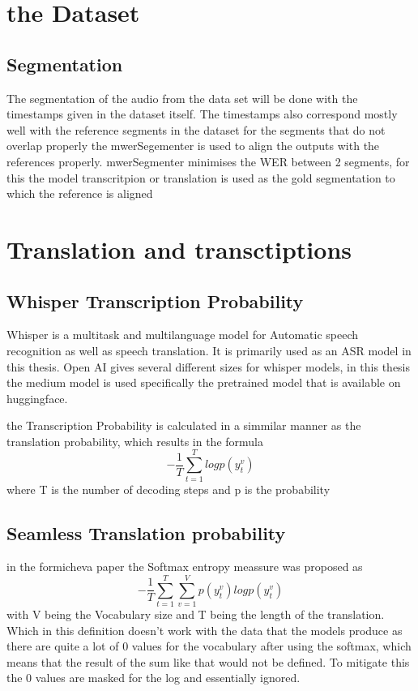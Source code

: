 


\chapter{the Dataset}
\label{ch:FirstContent}

\section{Segmentation}
\label{sec:FirstContent:FirstSection}
The segmentation of the audio from the data set will be done with the timestamps given in the dataset itself. The timestamps also correspond mostly well with the reference segments in the dataset 
for the segments that do not overlap properly the mwerSegementer is used to align the outputs with the references properly. 
mwerSegmenter minimises the WER between 2 segments,  for this the model transcritpion or translation is used as the gold segmentation to which the reference is aligned 

\chapter{Translation and transctiptions}
\section{Whisper Transcription Probability}
Whisper \cite{radford2022robust} is a multitask and multilanguage model for Automatic speech recognition as well as speech translation. It is primarily used as an ASR model in this thesis. Open AI gives several different sizes for whisper models, in this thesis the medium model is used specifically the pretrained model that is available on huggingface. 


the Transcription Probability is calculated in a simmilar manner as the translation probability, which results in the formula $$-\frac{1}{T}\sum_{t=1}^T log p(y_t^v)$$ where T is the number of decoding steps and p is the probability 

\section{Seamless Translation probability}
in the formicheva \cite{fomicheva2020unsupervised} paper the Softmax entropy meassure was proposed as $$-\frac{1}{T}\sum_{t=1}^T\sum_{v=1}^Vp(y_t^v)logp(y_t^v) \label{formula:translation probability}$$ with V being the Vocabulary size and T being the length of the translation. Which in this definition doesn't work with the data that the models produce as there are quite a lot of 0 values for the vocabulary after using the softmax, which means that the result of the sum like that would not be defined. To mitigate this the 0 values are masked for the log and essentially ignored. 


